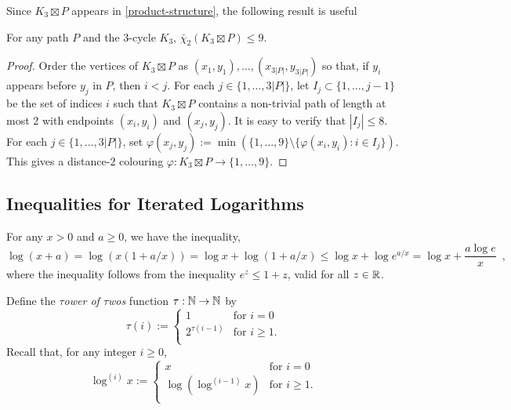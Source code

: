 \documentclass[kpfonts]{patmorin}
\newcommand{\dtcn}{\bar{\chi}_2}
\theoremstyle{named}
\begin{document}
Since $K_3\boxtimes P$ appears in \cref{product-structure}, the following result
is useful

\begin{lem}\label{dumb}
    For any path $P$ and the 3-cycle $K_3$, $\dtcn(K_3\boxtimes P)\le 9$.
\end{lem}

\begin{proof}
    Order the vertices of $K_3\boxtimes P$ as $(x_1,y_1),\ldots,(x_{3|P|},y_{3|P|})$ so that, if $y_i$ appears before $y_j$ in $P$, then $i<j$. For each $j\in\{1,\ldots,3|P|\}$, let $I_j\subset\{1,\ldots,j-1\}$ be the set of indices $i$ such that $K_3\boxtimes P$ contains a non-trivial path of length at most 2 with endpoints $(x_i,y_i)$ and $(x_j,y_j)$.  It is easy to verify that $|I_j|\le 8$.  For each $j\in\{1,\ldots,3|P|\}$, set $\varphi(x_j,y_j):=\min(\{1,\ldots,9\}\setminus\{\varphi(x_i,y_i):i\in I_j\})$.  This gives a distance-2 colouring $\varphi:K_3\boxtimes P\to\{1,\ldots,9\}$.
\end{proof}


\subsection{Inequalities for Iterated Logarithms}

For any $x> 0$ and $a\ge 0$, we have the inequality,
\begin{equation}
    \log (x+a) = \log (x(1+a/x)) = \log x + \log(1+a/x) \le \log x + \log e^{a/x} = \log x + \frac{a\log e}{x} \enspace , \label{log-x-plus-a}
\end{equation}
where the inequality follows from the inequality $e^z \le 1+z$, valid for all $z\in\mathbb{R}$.

Define the \emph{$\tau$ower of $\tau$wos} function $\tau:\mathbb{N}\to\mathbb{N}$ by
\[
  \tau(i) :=
    \begin{cases}
        1 & \text{for $i=0$} \\
        2^{\tau(i-1)} & \text{for $i\ge 1$.} \\
    \end{cases}
\]
Recall that, for any integer $i\ge 0$,
\[
    \log^{(i)} x :=
      \begin{cases}
          x & \text{for $i=0$} \\
          \log\left(\log^{(i-1)}x\right) & \text{for $i\ge 1$.} \\
      \end{cases}
\]
\end{document}
